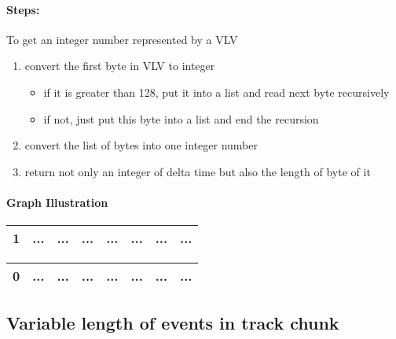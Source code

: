 \documentclass[12.5pt]{scrartcl}
\begin{document}
\paragraph{Steps:}
To get an integer number represented by a VLV
\begin{enumerate}
    \item convert the first byte in VLV to integer
        \begin{itemize}
            \item if it is greater than 128, put it into a list and read next byte recursively
            \item if not, just put this byte into a list and end the recursion
        \end{itemize}
    \item convert the list of bytes into one integer number
    \item return not only an integer of delta time but also the length of byte of it
\end{enumerate}

\paragraph{Graph Illustration}
\begin{center}
\renewcommand{\arraystretch}{0.9}%
    \begin{tabular}{|c|c|c|c|c|c|c|c|}
        \hline
        1&...&...&...&...&...&...&...\\[1pt]
        \hline
    \end{tabular}
    \begin{tabular}[height=0.3em]{|c|c|c|c|c|c|c|c|}
        \hline
        0&...&...&...&...&...&...&...\\
        \hline
    \end{tabular}
\end{center}
\subsection{Variable length of events in track chunk}
\end{document}
